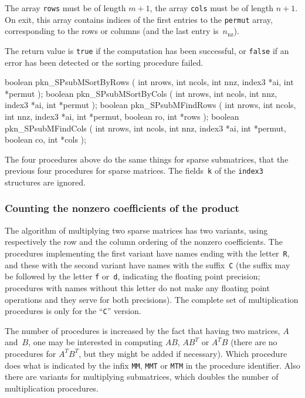The array \texttt{rows} must be of length $m+1$, the array \texttt{cols}
must be of length $n+1$. On exit, this array contains indices of the first
entries to the \texttt{permut} array, corresponding to the rows or columns
(and the last entry is~$n_{\mathrm{nz}}$).

The return value is \texttt{true} if the computation has been successful, or
\texttt{false} if an error has been detected or the sorting procedure
failed.


\medskip
\begin{listingC}
boolean pkn_SPsubMSortByRows ( int nrows, int ncols, int nnz,
                               index3 *ai, int *permut );
boolean pkn_SPsubMSortByCols ( int nrows, int ncols, int nnz,
                               index3 *ai, int *permut );
boolean pkn_SPsubMFindRows ( int nrows, int ncols, int nnz,
                             index3 *ai, int *permut, boolean ro,
                             int *rows );
boolean pkn_SPsubMFindCols ( int nrows, int ncols, int nnz,
                             index3 *ai, int *permut, boolean co,
                             int *cols );
\end{listingC}
The four procedures above do the same things for sparse submatrices, that
the previous four procedures for sparse matrices. The fields~\texttt{k} of
the \texttt{index3} structures are ignored.


\subsubsection{Counting the nonzero coefficients of the product}

The algorithm of multiplying two sparse matrices has two variants, using
respectively the row and the column ordering of the nonzero coefficients.
The procedures implementing the first variant have names ending with the
letter~\texttt{R}, and these with the second variant have names with the
suffix~\texttt{C} (the suffix may be followed by the letter \texttt{f}
or~\texttt{d}, indicating the floating point precision; procedures with
names without this letter do not make any floating point operations and they
serve for both precisions). The complete set of multiplication procedures is
only for the ``\texttt{C}'' version.

The number of procedures is increased by the fact that having two matrices,
$A$ and~$B$, one may be interested in computing $AB$, $AB^T$ or $A^TB$
(there are no procedures for $A^TB^T$, but they might be added if
necessary). Which procedure does what is indicated by the infix \texttt{MM},
\texttt{MMT} or \texttt{MTM} in the procedure identifier.
Also there are variants for multiplying submatrices, which doubles the
number of multiplication procedures.

